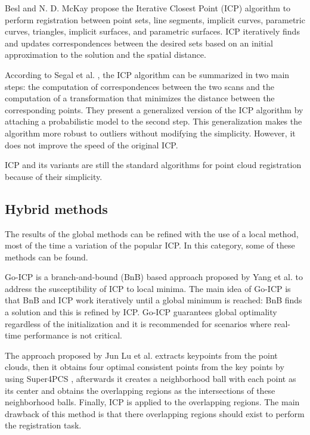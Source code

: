         Besl and N. D. McKay \cite{Besl_1992_amethod} propose the Iterative Closest Point (ICP) algorithm to perform registration 
        between point sets, line segments, implicit curves, parametric curves, triangles, implicit surfaces, and parametric surfaces.
        ICP iteratively finds and updates correspondences between the desired sets based on an initial approximation to the solution and 
        the spatial distance.

        According to Segal et al. \cite{Segal_2009_generalizedicp}, the ICP algorithm can be summarized in two main steps:
        the computation of correspondences between the two scans and 
        the computation of a transformation that minimizes the distance between the corresponding points.
        They present a generalized version of the ICP algorithm by attaching a probabilistic model to the second step.
        This generalization makes the algorithm more robust to outliers without modifying the simplicity. 
        However, it does not improve the speed of the original ICP.

        ICP and its variants are still the standard algorithms for point cloud registration because of their simplicity. 

        \subsection{Hybrid methods}

        The results of the global methods can be refined with the use of a local method, most of the time a variation of the popular ICP.
        In this category, some of these methods can be found.

        Go-ICP is a branch-and-bound (BnB) based approach proposed by Yang et al. \cite{Yang_2016_goicp} to address the susceptibility of ICP to local minima. 
        The main idea of Go-ICP is that BnB and ICP work iteratively until a global minimum is reached: BnB finds a solution and this is refined by ICP.
        Go-ICP guarantees global optimality regardless of the initialization and it is recommended for scenarios where real-time performance is not critical.

        The approach proposed by Jun Lu et al. \cite{Lu_2019_4pcsicp} extracts keypoints from the point clouds, 
        then it obtains four optimal consistent points from the key points by using Super4PCS \cite{Mellado_2014_super4pcs},  
        afterwards it creates a neighborhood ball with each point as its center and obtains the overlapping regions as the intersections of these neighborhood balls. 
        Finally, ICP is applied to the overlapping regions. 
        The main drawback of this method is that there overlapping regions should exist to perform the registration task.

